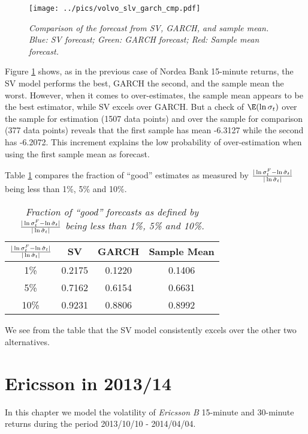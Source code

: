 \begin{figure}[htb!]
  \centering
    \texttt{[image: ../pics/volvo\_slv\_garch\_cmp.pdf]}
    \label{fig:volvo_slv_garch_cmp}
  \caption{\small \it Comparison of the forecast from SV, GARCH,
    and sample mean. Blue: SV forecast; Green: GARCH forecast; Red:
    Sample mean forecast.}
\end{figure}
Figure \ref{fig:volvo_slv_garch_cmp} shows, as in the previous case of
Nordea Bank 15-minute returns, the SV model performs the best, GARCH
the second, and the sample mean the worst. However, when it comes to
over-estimates, the sample mean appears to be the best estimator,
while SV excels over GARCH. But a check of $\E(\ln\sigma_t)$ over
the sample for estimation (1507 data points) and over the sample for
comparison (377 data points) reveals that the first sample has mean
-6.3127 while the second has -6.2072. This increment explains the low
probability of over-estimation when using the first sample mean as
forecast. 

Table \ref{tab:volvo_good_percentage} compares the fraction of
``good'' estimates as measured by ${|\ln\sigma^F_t -
  \ln\hat{\sigma}_t| \over |\ln \hat{\sigma}_t|}$ being less than 1\%,
5\% and 10\%.
\begin{table}[htb!]
  \centering
  \begin{tabular}{|c|c|c|c|}
    \hline
    ${|\ln \sigma^F_t - \ln \hat{\sigma}_t| \over |\ln
      \hat{\sigma}_t|}$ &
    SV & GARCH & Sample Mean \\
    \hline
    1\% & 0.2175 & 0.1220 & 0.1406 \\
    \hline
    5\% & 0.7162 & 0.6154 & 0.6631 \\
    \hline
    10\% & 0.9231 & 0.8806 & 0.8992 \\
    \hline
  \end{tabular}
  \caption{\small \it Fraction of ``good'' forecasts as defined by
    ${|\ln \sigma^F_t - \ln \hat{\sigma}_t| \over |\ln
      \hat{\sigma}_t|}$ being less than 1\%, 5\% and 10\%.}
  \label{tab:volvo_good_percentage}
\end{table}
We see from the table that the SV model consistently excels over
the other two alternatives.

\chapter{Ericsson in 2013/14}
\label{chp:ericsson}
In this chapter we model the volatility of {\it Ericsson B}
15-minute and 30-minute returns during the period 2013/10/10 -
2014/04/04.

